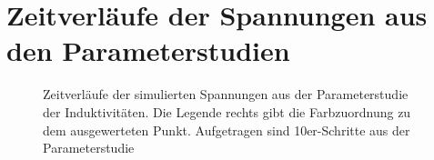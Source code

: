 \section{Zeitverläufe der Spannungen aus den Parameterstudien}
\begin{figure}[!ht]
    \centering
    \begin{subfigure}{\linewidth}
        \centering
        \label{fig:InduktivitatenSweepA}
    \end{subfigure}
    \caption{Zeitverläufe der simulierten Spannungen aus der Parameterstudie der Induktivitäten. Die Legende rechts gibt die Farbzuordnung zu dem ausgewerteten Punkt. Aufgetragen sind 10er-Schritte aus der Parameterstudie}
\end{figure}

